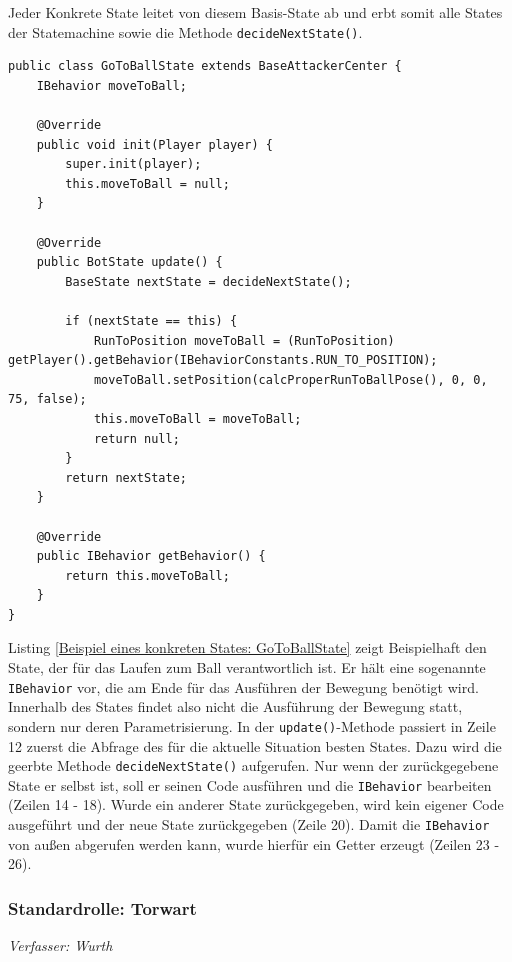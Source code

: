 \documentclass[fontsize=12pt,a4paper,final]{scrartcl}[2003/01/01]
\begin{document}
Jeder Konkrete State leitet von diesem Basis-State ab und erbt somit alle States der Statemachine sowie die Methode \lstinline$decideNextState()$.
\\

\begin{lstlisting}[caption=Beispiel eines konkreten States: GoToBallState, captionpos=b, label=Beispiel eines konkreten States: GoToBallState]
public class GoToBallState extends BaseAttackerCenter {
    IBehavior moveToBall;

    @Override
    public void init(Player player) {
        super.init(player);
        this.moveToBall = null;
    }

    @Override
    public BotState update() {
        BaseState nextState = decideNextState();

        if (nextState == this) {
            RunToPosition moveToBall = (RunToPosition) getPlayer().getBehavior(IBehaviorConstants.RUN_TO_POSITION);
            moveToBall.setPosition(calcProperRunToBallPose(), 0, 0, 75, false);
            this.moveToBall = moveToBall;
            return null;
        }
        return nextState;
    }

    @Override
    public IBehavior getBehavior() {
        return this.moveToBall;
    }
}
\end{lstlisting}

Listing \ref{Beispiel eines konkreten States: GoToBallState} zeigt Beispielhaft den State, der für das Laufen zum Ball verantwortlich ist. Er hält eine sogenannte \lstinline$IBehavior$ vor, die am Ende für das Ausführen der Bewegung benötigt wird. Innerhalb des States findet also nicht die Ausführung der Bewegung statt, sondern nur deren Parametrisierung. In der \lstinline$update()$-Methode passiert in Zeile 12 zuerst die Abfrage des für die aktuelle Situation besten States. Dazu wird die geerbte Methode \lstinline$decideNextState()$ aufgerufen. Nur wenn der zurückgegebene State er selbst ist, soll er seinen Code ausführen und die \lstinline$IBehavior$ bearbeiten (Zeilen 14 - 18). Wurde ein anderer State zurückgegeben, wird kein eigener Code ausgeführt und der neue State zurückgegeben (Zeile 20). Damit die \lstinline$IBehavior$ von außen abgerufen werden kann, wurde hierfür ein Getter erzeugt (Zeilen 23 - 26).

\subsubsection{Standardrolle: Torwart}
\textit{Verfasser: Wurth}\\
\end{document}
